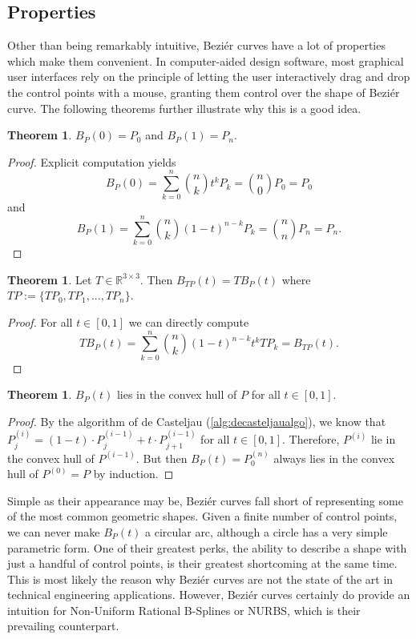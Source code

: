 \documentclass[a4paper, 11pt]{report}
\theoremstyle{definition}
\newtheorem{theorem}[definition]{Theorem}
\begin{document}
\subsection{Properties}
	Other than being remarkably intuitive, Beziér curves have a lot of properties which make them convenient. In computer-aided design software, most graphical user interfaces rely on the principle of letting the user interactively drag and drop the control points with a mouse, granting them control over the shape of Beziér curve. The following theorems further illustrate why this is a good idea.

	\begin{theorem}
		$B_P(0) = P_0$ and $B_P(1) = P_n$.
	\end{theorem}
	\begin{proof}
		Explicit computation yields
			$$B_P(0) = \sum_{k=0}^n \binom{n}{k} t^k P_k = \binom{n}{0} P_0 = P_0$$
		and
			$$B_P(1) = \sum_{k=0}^n \binom{n}{k} (1-t)^{n-k} P_k = \binom{n}{n} P_n = P_n.$$
	\end{proof}

	\begin{theorem}
		Let $T \in \mathbb{R}^{3 \times 3}$. Then $B_{TP}(t) = TB_P(t)$ where $TP := \{TP_0, TP_1, ..., TP_n\}$.
	\end{theorem}
	\begin{proof}
		For all $t \in [0, 1]$ we can directly compute
			$$TB_P(t) = \sum_{k=0}^n \binom{n}{k} (1-t)^{n-k}t^k TP_k = B_{TP}(t).$$
	\end{proof}

	\begin{theorem}
		$B_P(t)$ lies in the convex hull of $P$ for all $t \in [0,1]$.
	\end{theorem}
	\begin{proof}
		By the algorithm of de Casteljau (\ref{alg:decasteljaualgo}), we know that $P^{(i)}_j = (1-t) \cdot P^{(i-1)}_j + t \cdot P^{(i-1)}_{j+1}$ for all $t \in [0, 1]$. Therefore, $P^{(i)}$ lie in the convex hull of $P^{(i-1)}$. But then $B_P(t) = P^{(n)}_0$ always lies in the convex hull of $P^{(0)} = P$ by induction.
	\end{proof}

	Simple as their appearance may be, Beziér curves fall short of representing some of the most common geometric shapes. Given a finite number of control points, we can never make $B_P(t)$ a circular arc, although a circle has a very simple parametric form. One of their greatest perks, the ability to describe a shape with just a handful of control points, is their greatest shortcoming at the same time. This is most likely the reason why Beziér curves are not the state of the art in technical engineering applications. However, Beziér curves certainly do provide an intuition for Non-Uniform Rational B-Splines or NURBS, which is their prevailing counterpart.
\end{document}
